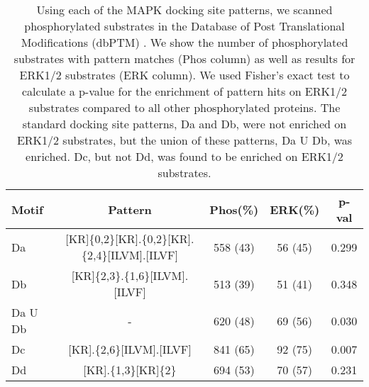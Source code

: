 \begin{table}\footnotesize
\begin{center}
  \begin{tabular}{|l|c|c|c|c|}
  \hline
  Motif	& Pattern & Phos(\%) & ERK(\%) & p-val\\
  \hline
Da &	[KR]\{0,2\}[KR].\{0,2\}[KR].\{2,4\}[ILVM].[ILVF] & 558 (43) & 56 (45) & 0.299\\
Db&	[KR]\{2,3\}.\{1,6\}[ILVM].[ILVF]&	513 (39)&	51 (41)&	0.348\\
Da U Db&	-&	620 (48)&	69 (56)&	0.030\\
Dc&	[KR].\{2,6\}[ILVM].[ILVF]&	841 (65)&	92 (75)&	0.007\\
Dd&	[KR].\{1,3\}[KR]\{2\}&	694 (53)&	70 (57)&	0.231\\
\hline
  \end{tabular}
\end{center}
\caption[MAPK docking pattern hits on human proteins]{\small Using
  each of the MAPK docking site patterns, we scanned phosphorylated
  substrates in the Database of Post Translational Modifications
  (dbPTM) \cite{lee06}. We show the number of phosphorylated
  substrates with pattern matches (Phos column) as well as results for
  ERK1/2 substrates (ERK column). We used Fisher's exact test to
  calculate a p-value for the enrichment of pattern hits on ERK1/2
  substrates compared to all other phosphorylated proteins. The
  standard docking site patterns, Da and Db, were not enriched on
  ERK1/2 substrates, but the union of these patterns, Da U Db, was
  enriched. Dc, but not Dd, was found to be enriched on ERK1/2
  substrates. \label{tbl:plosONE1:patterns}}
\end{table}

